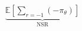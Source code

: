 \documentclass[preview]{standalone}
\begin{document}
\begin{align*}
\underbrace{\mathbb{E}\!\left[\sum_{r=-1}(-\pi_\theta)\right]}_{\text{NSR}}
\end{align*}
\end{document}
